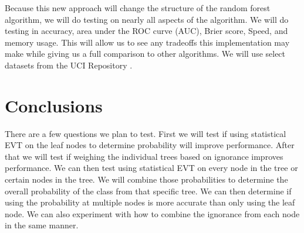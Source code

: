 \documentclass[conference]{IEEEtran}
\begin{document}
Because this new approach will change the structure of the random forest algorithm, we will do testing 
on nearly all aspects of the algorithm.  We will do testing in accuracy, area under the ROC curve (AUC), Brier score, Speed, and memory usage.  This will allow us to see any tradeoffs this implementation may make while giving us a full comparison to other algorithms.  We will use select datasets from the UCI Repository \cite{ucirepo}.

\section{Conclusions}

There are a few questions we plan to test.  First we will test if using statistical EVT on the leaf nodes to determine
probability will improve performance.  After that we will test if weighing the individual trees based on ignorance improves performance.  We can then test using statistical EVT on every node in the tree or certain nodes in the tree.  We will combine those probabilities to determine the overall probability of the class from that specific tree.  We can then determine if using the probability at multiple nodes is more accurate than only using the leaf node.  We can also experiment with how to combine the ignorance from each node in the same manner. 


\end{document}
